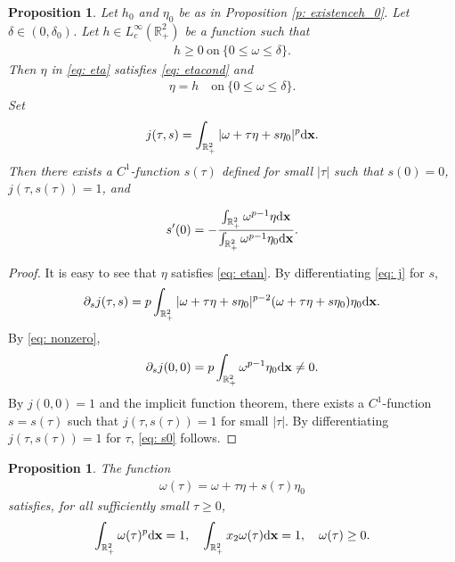 \documentclass[11pt]{amsart}
\newtheorem{proposition}[theorem]{Proposition}
\theoremstyle{definition}
\theoremstyle{definition}
\numberwithin{equation}{section}
\newcommand{\0}{\emptyset}
\newcommand{\bfx}{{\bf x}}
\newcommand{\dd}{\mathrm{d}}
\begin{document}
		
		\begin{proposition}\label{p: IFT}
			Let $h_0$ and $\eta_0$ be as in Proposition \ref{p: existenceh_0}. Let $\delta \in (0,\delta_0)$.  Let $h\in L^{\infty}_{c}(\mathbb{R}^{2}_{+})$ be a function such that 
			\begin{align}
				h\geq 0\ \textrm{on}\ \{0\leq \omega\leq \delta\}.    \label{eq: h}
			\end{align}
			Then $\eta$ in \eqref{eq: eta} satisfies \eqref{eq: etacond} and 
			\begin{align}
				\eta=h\quad \textrm{on}\ \{0\leq \omega\leq \delta\}.    \label{eq: etan}
			\end{align}
			Set 
			\begin{align}
				j(\tau,s)=\int_{\mathbb{R}^{2}_{+}}|\omega+\tau \eta+s\eta_0|^{p}\dd\bfx.  \label{eq: j}
			\end{align}
			Then there exists a $C^{1}$-function $s(\tau)$ defined for small $|\tau|$ such that $s(0)=0$,  $j(\tau,s(\tau))=1$, and  
			
			\begin{align}
				s'(0)=-\frac{\int_{\mathbb{R}^{2}_{+}}\omega^{p-1}\eta \dd\bfx}{\int_{\mathbb{R}^{2}_{+}}\omega^{p-1}\eta_0\dd\bfx}.    \label{eq: s0}
			\end{align}
		\end{proposition}
		
		\begin{proof}
			It is easy to see that $\eta$ satisfies \eqref{eq: etan}. By differentiating \eqref{eq: j} for $s$,
			\begin{align*}
				\partial_sj(\tau,s)=p\int_{\mathbb{R}^{2}_{+}}|\omega+\tau \eta+s\eta_0|^{p-2}(\omega+\tau \eta+s\eta_0)\eta_0\dd\bfx.
			\end{align*}
			By \eqref{eq: nonzero}, 
			\begin{align*}
				\partial_sj(0,0)=p\int_{\mathbb{R}^{2}_{+}}\omega^{p-1}\eta_0\dd\bfx\neq 0.
			\end{align*}
			By $j(0,0)=1$ and the implicit function theorem, there exists a $C^{1}$-function $s=s(\tau)$ such that $j(\tau,s(\tau))=1$ for small $|\tau|$. By differentiating $j(\tau,s(\tau))=1$ for $\tau$, \eqref{eq: s0} follows.
		\end{proof}
		
		
		\begin{proposition}
			The function 
			\begin{align}
				\omega(\tau)=\omega+\tau \eta+s(\tau)\eta_0   \label{eq: adjusted}
			\end{align}
			satisfies{, for all sufficiently small $\tau \ge 0$,}
			\begin{equation}
				\begin{aligned}
					\int_{\mathbb{R}^{2}_{+}}\omega(\tau)^{p}\dd\bfx=1,\quad
					\int_{\mathbb{R}^{2}_{+}}x_2 \omega(\tau)\dd\bfx=1,\quad
					\omega(\tau)\geq 0.   
				\end{aligned}
				\label{eq: constraints}
			\end{equation}
		\end{proposition}
\end{document}

